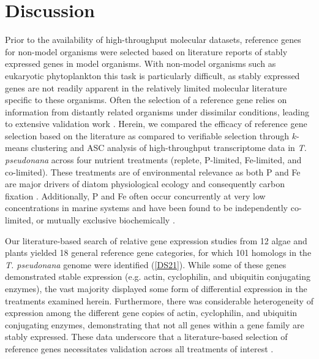\section{Discussion}
	Prior to the availability of high-throughput molecular datasets, reference genes for non-model organisms were selected based on literature reports of stably expressed genes in model organisms. With non-model organisms such as eukaryotic phytoplankton this task is particularly difficult, as stably expressed genes are not readily apparent in the relatively limited molecular literature specific to these organisms. Often the selection of a reference gene relies on information from distantly related organisms under dissimilar conditions, leading to extensive validation work \citep{McDonald2010, Whitney2011a}. Herein, we compared the efficacy of reference gene selection based on the literature as compared to verifiable selection through $k$-means clustering and ASC analysis of high-throughput transcriptome data in \textit{T. pseudonana} across four nutrient treatments (replete, P-limited, Fe-limited, and co-limited). These treatments are of environmental relevance as both P and Fe are major drivers of diatom physiological ecology and consequently carbon fixation \citep{Moore2004}. Additionally, P and Fe often occur concurrently at very low concentrations in marine systems and have been found to be independently co-limited, or mutually exclusive biochemically \citep{Saito2008}.\par
    Our literature-based search of relative gene expression studies from 12 algae and plants yielded 18 general reference gene categories, for which 101 homologs in the \textit{T. pseudonana} genome were identified (\ref{DS21}). While some of these genes demonstrated stable expression (e.g. actin, cyclophilin, and ubiquitin conjugating enzymes), the vast majority displayed some form of differential expression in the treatments examined herein. Furthermore, there was considerable heterogeneity of expression among the different gene copies of actin, cyclophilin, and ubiquitin conjugating enzymes, demonstrating that not all genes within a gene family are stably expressed. These data underscore that a literature-based selection of reference genes necessitates validation across all treatments of interest \citep{Vandesompele2002, Pfaffl2004}. \par
